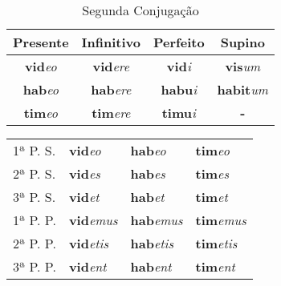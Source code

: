 \documentclass{book}
\newcommand{\radicaldesinencia}[2]{\textbf{#1}\textit{#2}}
\begin{document}
\begin{table}
\centering
\caption{Segunda Conjugação}
\vspace{0.2cm}
\begin{tabular}{c|c|c|c}
\hline
Presente		&	Infinitivo		&	Perfeito		&	Supino	\\
\hline                                    		
\radicaldesinencia{vid}{eo}	&	\radicaldesinencia{vid}{ere}	&	\radicaldesinencia{vid}{i}	&	\radicaldesinencia{vis}{um}	\\
\radicaldesinencia{hab}{eo}	&	\radicaldesinencia{hab}{ere}	&	\radicaldesinencia{habu}{i}	&	\radicaldesinencia{habit}{um}	\\
\radicaldesinencia{tim}{eo}	&	\radicaldesinencia{tim}{ere}	&	\radicaldesinencia{timu}{i}	&	\radicaldesinencia{-}{}	\\
 \hline
\end{tabular}
\end{table}

\begin{table}
\centering
\begin{tabular}{l|l|l|l}
\hline
1ª P. S.	&  \radicaldesinencia{vid}{eo}		& \radicaldesinencia{hab}{eo}		& \radicaldesinencia{tim}{eo} \\
2ª P. S.	&  \radicaldesinencia{vid}{es} 	& \radicaldesinencia{hab}{es}		& \radicaldesinencia{tim}{es} \\
3ª P. S.	&  \radicaldesinencia{vid}{et} 	& \radicaldesinencia{hab}{et}		& \radicaldesinencia{tim}{et} \\
\hline
\hline
1ª P. P.	&  \radicaldesinencia{vid}{emus} 	& \radicaldesinencia{hab}{emus}	& \radicaldesinencia{tim}{emus} \\
2ª P. P. 	&  \radicaldesinencia{vid}{etis} 	& \radicaldesinencia{hab}{etis} 	& \radicaldesinencia{tim}{etis} \\
3ª P. P.	&  \radicaldesinencia{vid}{ent} 	& \radicaldesinencia{hab}{ent}		& \radicaldesinencia{tim}{ent} \\ 
\hline
\end{tabular}
\end{table}
\clearpage
\end{document}
